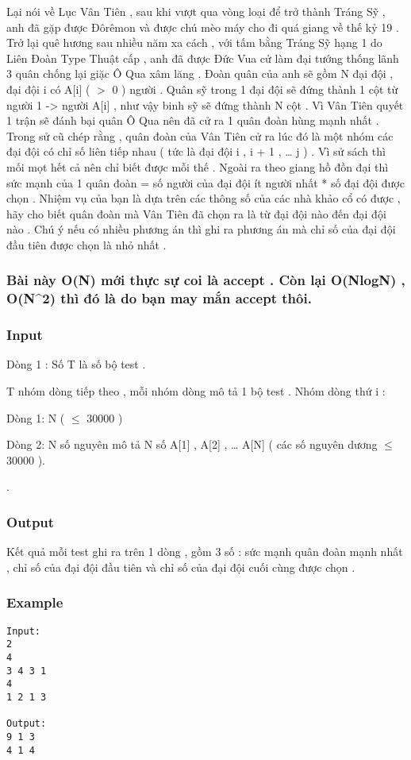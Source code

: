 



   Lại nói về Lục Vân Tiên , sau khi vượt qua vòng loại để trở thành Tráng Sỹ , anh đã gặp được Đôrêmon và được chú mèo máy cho đi quá giang về thế kỷ 19 . Trở lại quê hương sau nhiều năm xa cách , với tấm bằng Tráng Sỹ hạng 1 do Liên Đoàn Type Thuật cấp , anh đã được Đức Vua cử làm đại tướng thống lãnh 3 quân chống lại giặc Ô Qua xâm lăng . Đoàn quân của anh sẽ gồm N đại đội , đại đội i có A[i] ( $>$ 0 ) người . Quân sỹ trong 1 đại đội sẽ đứng thành 1 cột từ người 1 -> người A[i] , như vậy binh sỹ sẽ đứng thành N cột . Vì Vân Tiên quyết 1 trận sẽ đánh bại quân Ô Qua nên đã cử ra 1 quân đoàn hùng mạnh nhất . Trong sử cũ chép rằng , quân đoàn của Vân Tiên cử ra lúc đó là một nhóm các đại đội có chỉ số liên tiếp nhau ( tức là đại đội i , i + 1 , … j ) . Vì sử sách thì mối mọt hết cả nên chỉ biết được mỗi thế . Ngoài ra theo giang hồ đồn đại thì sức mạnh của 1 quân đoàn = số người của đại đội ít người nhất * số đại đội được chọn . Nhiệm vụ của bạn là dựa trên các thông số của các nhà khảo cổ có được , hãy cho biết quân đoàn mà Vân Tiên đã chọn ra là từ đại đội nào đến đại đội nào . Chú ý nếu có nhiều phương án thì ghi ra phương án mà chỉ số của đại đội đầu tiên được chọn là nhỏ nhất .  

\subsubsection{   Bài này O(N) mới thực sự coi là accept . Còn lại O(NlogN) , O(N^2) thì đó là do bạn may mắn accept thôi.  }

\subsubsection{   Input  }

   Dòng 1 : Số T là số bộ test .   


   T nhóm dòng tiếp theo , mỗi nhóm dòng mô tả 1 bộ test . Nhóm dòng thứ i :   


   Dòng 1: N (  $\le$  30000 )   


   Dòng 2: N số nguyên mô tả N số A[1] , A[2] , … A[N] ( các số nguyên dương  $\le$  30000 ).   


   .  

\subsubsection{   Output  }

   Kết quả mỗi test ghi ra trên 1 dòng , gồm 3 số : sức mạnh quân đoàn mạnh nhất , chỉ số của đại đội đầu tiên và chỉ số của đại đội cuối cùng được chọn .  

\subsubsection{   Example  }
\begin{verbatim}
Input:
2
4
3 4 3 1
4
1 2 1 3

Output:
9 1 3
4 1 4
\end{verbatim}
